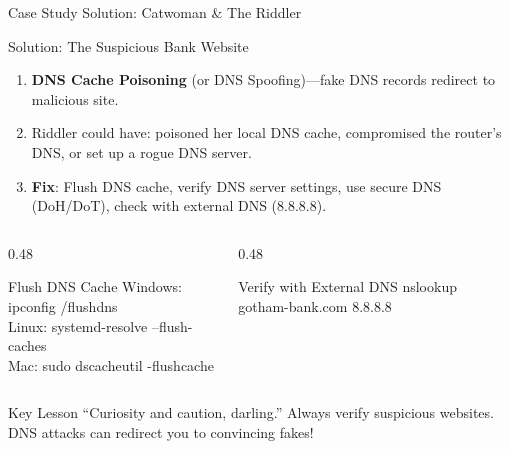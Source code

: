 \documentclass[aspectratio=169, 11pt]{beamer}
\newenvironment{casesolution}[1]{%
    \begin{exampleblock}{Solution: #1}
}{\end{exampleblock}}
\begin{document}
\begin{frame}{Case Study Solution: Catwoman \& The Riddler}
    \begin{casesolution}{The Suspicious Bank Website}
        \small
        \begin{enumerate}\setlength{\itemsep}{1pt}
            \item \textbf{DNS Cache Poisoning} (or DNS Spoofing)---fake DNS records redirect to malicious site.
            \item Riddler could have: poisoned her local DNS cache, compromised the router's DNS, or set up a rogue DNS server.
            \item \textbf{Fix}: Flush DNS cache, verify DNS server settings, use secure DNS (DoH/DoT), check with external DNS (8.8.8.8).
        \end{enumerate}
    \end{casesolution}
    
    \vspace{0.2em}
    \begin{columns}[T]
        \begin{column}{0.48\textwidth}
            \begin{block}{Flush DNS Cache}
                \ttfamily\small
                Windows: ipconfig /flushdns \\
                Linux: systemd-resolve --flush-caches \\
                Mac: sudo dscacheutil -flushcache
            \end{block}
        \end{column}
        \begin{column}{0.48\textwidth}
            \begin{block}{Verify with External DNS}
                \ttfamily\small
                nslookup gotham-bank.com 8.8.8.8
            \end{block}
        \end{column}
    \end{columns}
    
    \vspace{0.2em}
    \begin{alertblock}{Key Lesson}
        \small
        ``Curiosity and caution, darling.'' Always verify suspicious websites. DNS attacks can redirect you to convincing fakes!
    \end{alertblock}
\end{frame}
\end{document}
